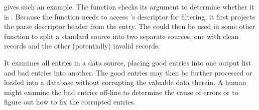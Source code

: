  gives such an example. The 
function checks its argument  to determine whether it is
. Because the function needs to access 's descriptor
for filtering, it first projects the parse descriptor header from the
entry.  The  could then be used in some other function
to split a standard \dibbler{} source into two separate sources, one
with clean records and the other (potentially) invalid records.


It examines all
entries in a \dibbler{} data source, placing good entries into one
output list and bad entries into another.  The good entries may then
be further processed or loaded into a database without corrupting the
valuable data therein.  A human might examine the bad entries off-line
to determine the cause of errors or to figure out how to fix the
corrupted entries.



